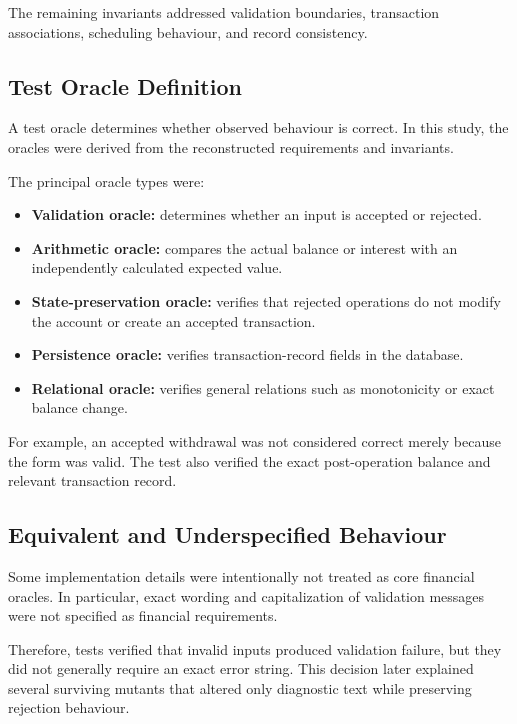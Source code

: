 \documentclass[12pt]{article}
\begin{document}
The remaining invariants addressed validation boundaries, transaction
associations, scheduling behaviour, and record consistency.

\subsection{Test Oracle Definition}

A test oracle determines whether observed behaviour is correct. In this study,
the oracles were derived from the reconstructed requirements and invariants.

The principal oracle types were:

\begin{itemize}
    \item \textbf{Validation oracle:} determines whether an input is accepted
          or rejected.
    \item \textbf{Arithmetic oracle:} compares the actual balance or interest
          with an independently calculated expected value.
    \item \textbf{State-preservation oracle:} verifies that rejected operations
          do not modify the account or create an accepted transaction.
    \item \textbf{Persistence oracle:} verifies transaction-record fields in
          the database.
    \item \textbf{Relational oracle:} verifies general relations such as
          monotonicity or exact balance change.
\end{itemize}

For example, an accepted withdrawal was not considered correct merely because
the form was valid. The test also verified the exact post-operation balance
and relevant transaction record.

\subsection{Equivalent and Underspecified Behaviour}

Some implementation details were intentionally not treated as core financial
oracles. In particular, exact wording and capitalization of validation
messages were not specified as financial requirements.

Therefore, tests verified that invalid inputs produced validation failure, but
they did not generally require an exact error string. This decision later
explained several surviving mutants that altered only diagnostic text while
preserving rejection behaviour.
\end{document}
